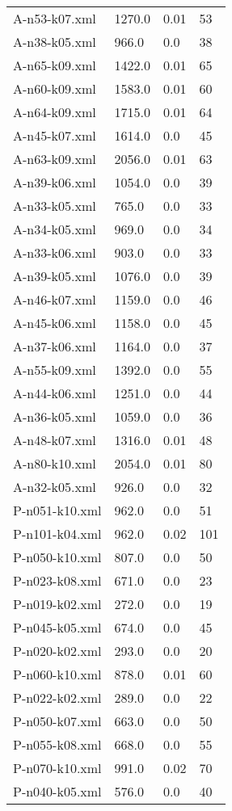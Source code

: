 \documentclass[12pt]{article}
\begin{document}
\begin{appendices}
\begin{table}[]
\begin{tabular}{llll}
	A-n53-k07.xml & 1270.0 & 0.01 & 53 \\
	A-n38-k05.xml & 966.0 & 0.0 & 38 \\
	A-n65-k09.xml & 1422.0 & 0.01 & 65 \\
	A-n60-k09.xml & 1583.0 & 0.01 & 60 \\
	A-n64-k09.xml & 1715.0 & 0.01 & 64 \\
	A-n45-k07.xml & 1614.0 & 0.0 & 45 \\
	A-n63-k09.xml & 2056.0 & 0.01 & 63 \\
	A-n39-k06.xml & 1054.0 & 0.0 & 39 \\
	A-n33-k05.xml & 765.0 & 0.0 & 33 \\
	A-n34-k05.xml & 969.0 & 0.0 & 34 \\
	A-n33-k06.xml & 903.0 & 0.0 & 33 \\
	A-n39-k05.xml & 1076.0 & 0.0 & 39 \\
	A-n46-k07.xml & 1159.0 & 0.0 & 46 \\
	A-n45-k06.xml & 1158.0 & 0.0 & 45 \\
	A-n37-k06.xml & 1164.0 & 0.0 & 37 \\
	A-n55-k09.xml & 1392.0 & 0.0 & 55 \\
	A-n44-k06.xml & 1251.0 & 0.0 & 44 \\
	A-n36-k05.xml & 1059.0 & 0.0 & 36 \\
	A-n48-k07.xml & 1316.0 & 0.01 & 48 \\
	A-n80-k10.xml & 2054.0 & 0.01 & 80 \\
	A-n32-k05.xml & 926.0 & 0.0 & 32 \\
	P-n051-k10.xml & 962.0 & 0.0 & 51 \\
	P-n101-k04.xml & 962.0 & 0.02 & 101 \\
	P-n050-k10.xml & 807.0 & 0.0 & 50 \\
	P-n023-k08.xml & 671.0 & 0.0 & 23 \\
	P-n019-k02.xml & 272.0 & 0.0 & 19 \\
	P-n045-k05.xml & 674.0 & 0.0 & 45 \\
	P-n020-k02.xml & 293.0 & 0.0 & 20 \\
	P-n060-k10.xml & 878.0 & 0.01 & 60 \\
	P-n022-k02.xml & 289.0 & 0.0 & 22 \\
	P-n050-k07.xml & 663.0 & 0.0 & 50 \\
	P-n055-k08.xml & 668.0 & 0.0 & 55 \\
	P-n070-k10.xml & 991.0 & 0.02 & 70 \\
	P-n040-k05.xml & 576.0 & 0.0 & 40 \\

\end{tabular}
\end{table}
\end{appendices}
\end{document}
